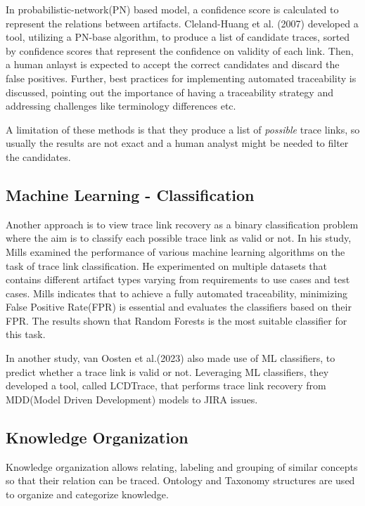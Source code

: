 In probabilistic-network(PN) based model, a confidence score is calculated to represent the relations between artifacts. Cleland-Huang et al. (2007)\cite{cleland-huang-2007} developed a tool, utilizing a PN-base algorithm, to produce a list of candidate traces, sorted by confidence scores that represent the confidence on validity of each link. Then, a human anlayst is expected to accept the correct candidates and discard the false positives. Further, best practices for implementing automated traceability is discussed, pointing out the importance of having a traceability strategy and addressing challenges like terminology differences etc.

A limitation of these methods is that they produce a list of \textit{possible} trace links, so usually the results are not exact and a human analyst might be needed to filter the candidates.

\subsection{Machine Learning - Classification}

Another approach is to view trace link recovery as a binary classification problem where the aim is to classify each possible trace link as valid or not. In his study, Mills examined the performance of various machine learning algorithms on the task of trace link classification. He experimented on multiple datasets that contains different artifact types varying from requirements to use cases and test cases. Mills indicates that to achieve a fully automated traceability, minimizing False Positive Rate(FPR) is essential and evaluates the classifiers based on their FPR. The results shown that Random Forests is the most suitable classifier for this task.

In another study, van Oosten et al.(2023)\cite{VANOOSTEN2023107226} also made use of ML classifiers, to predict whether a trace link is valid or not. Leveraging ML classifiers, they developed a tool, called LCDTrace, that performs trace link recovery from MDD(Model Driven Development) models to JIRA issues.

\subsection{Knowledge Organization}

Knowledge organization allows relating, labeling and grouping of similar concepts so that their relation can be traced. Ontology and Taxonomy structures are used to organize and categorize knowledge.

